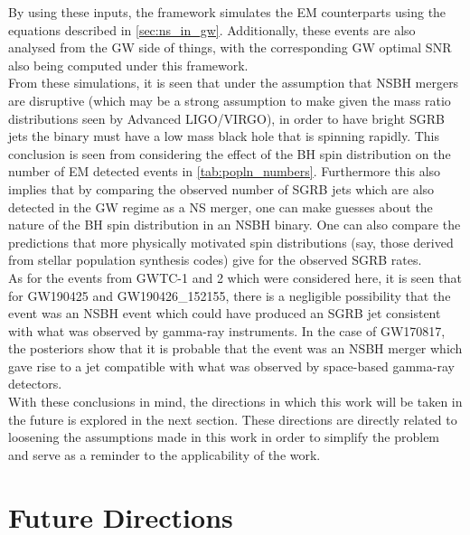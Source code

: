     By using these inputs, the framework simulates the EM counterparts using the
    equations described in \ref{sec:ns_in_gw}.  Additionally, these events are also
    analysed from the GW side of things, with the corresponding GW optimal SNR also
    being computed under this framework.\\
    From these simulations, it is seen that under the assumption that NSBH mergers are
    disruptive (which may be a strong assumption to make given the mass ratio
    distributions seen by Advanced LIGO/VIRGO), in order to have bright SGRB jets the
    binary must have a low mass black hole that is spinning rapidly. This conclusion is
    seen from considering the effect of the BH spin distribution on the number of EM
    detected events in \ref{tab:popln_numbers}. Furthermore this also implies that by
    comparing the observed number of SGRB jets which are also detected in the GW regime
    as a NS merger, one can make guesses about the nature of the BH spin distribution in
    an NSBH binary. One can also compare the predictions that more physically motivated
    spin distributions (say, those derived from stellar population synthesis codes) give
    for the observed SGRB rates.\\
    As for the events from GWTC-1 and 2 which were considered here, it is seen that for
    GW190425 and GW190426\_152155, there is a negligible possibility that the event was
    an NSBH event which could have produced an SGRB jet consistent with what was 
    observed by gamma-ray instruments. In the case of GW170817, the posteriors show that
    it is probable that the event was an NSBH merger which gave rise to a jet compatible
    with what was observed by space-based gamma-ray detectors.\\
    With these conclusions in mind, the directions in which this work will be taken in
    the future is explored in the next section. These directions are directly related to
    loosening the assumptions made in this work in order to simplify the problem and
    serve as a reminder to the applicability of the work.

    \section{Future Directions}

